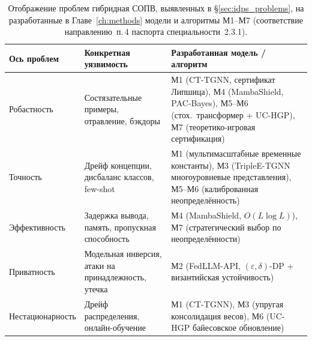 \begin{table}[H]
\centering
\caption{Отображение проблем гибридная СОПВ, выявленных в \S\ref{sec:idps_problems}, на разработанные в Главе~\ref{ch:methods} модели и алгоритмы М1--М7 (соответствие направлению~п.\,4 паспорта специальности~2.3.1).}
\label{tab:models_to_methods}
\small
\setlength{\tabcolsep}{4pt}
\renewcommand{\arraystretch}{0.92}\begin{tabular}{p{3.0cm} p{4.5cm} p{6.5cm}}
\toprule
\textbf{Ось проблем} & \textbf{Конкретная уязвимость} & \textbf{Разработанная модель / алгоритм} \\
\midrule
Робастность     & Состязательные примеры, отравление, бэкдоры
                & М1 (CT-TGNN, сертификат Липшица), М4 (MambaShield, PAC-Bayes), М5--М6 (стох.\ трансформер + UC-HGP), М7 (теоретико-игровая сертификация) \\
\addlinespace
Точность        & Дрейф концепции, дисбаланс классов, few-shot
                & М1 (мультимасштабные временные константы), М3 (TripleE-TGNN многоуровневые представления), М5--М6 (калиброванная неопределённость) \\
\addlinespace
Эффективность   & Задержка вывода, память, пропускная способность
                & М4 (MambaShield, $O(L\log L)$), М7 (стратегический выбор по неопределённости) \\
\addlinespace
Приватность     & Модельная инверсия, атаки на принадлежность, утечка
                & М2 (FedLLM-API, $(\varepsilon,\delta)$-DP + византийская устойчивость) \\
\addlinespace
Нестационарность & Дрейф распределения, онлайн-обучение
                & М1 (CT-TGNN), М3 (упругая консолидация весов), М6 (UC-HGP байесовское обновление) \\
\bottomrule
\end{tabular}\end{table}

